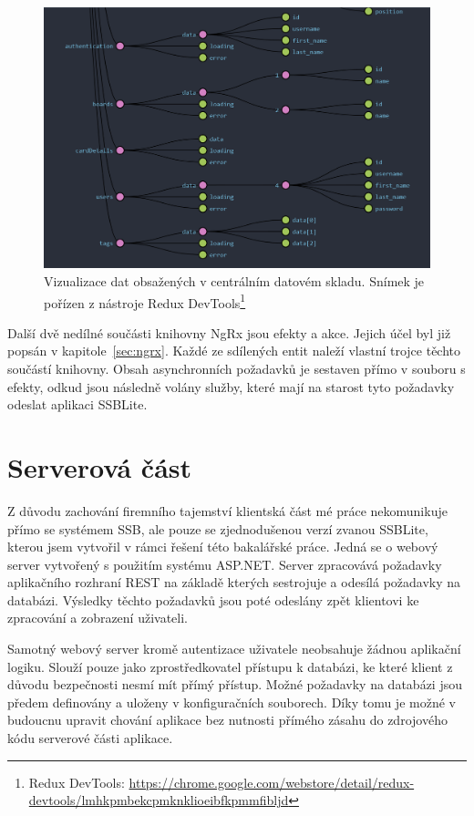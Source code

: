 \begin{figure}[H]
	\centering
	\label{img:ngrx-devtools}
	\includegraphics[width=\textwidth]{obrazky-figures/ngrx-chart.png}
	\caption{Vizualizace dat obsažených v centrálním datovém skladu. Snímek je pořízen z nástroje Redux DevTools\footnote{Redux DevTools: \url{https://chrome.google.com/webstore/detail/redux-devtools/lmhkpmbekcpmknklioeibfkpmmfibljd}}}
\end{figure}

Další dvě nedílné součásti knihovny NgRx jsou efekty a akce. Jejich účel byl již popsán v kapitole~\ref{sec:ngrx}. Každé ze sdílených entit naleží vlastní trojce těchto součástí knihovny. Obsah asynchronních požadavků je sestaven přímo v souboru s efekty, odkud jsou následně volány služby, které mají na starost tyto požadavky odeslat aplikaci SSBLite.



\section{Serverová část}
Z důvodu zachování firemního tajemství klientská část mé práce nekomunikuje přímo se systémem SSB, ale pouze se zjednodušenou verzí zvanou SSBLite, kterou jsem vytvořil v rámci řešení této bakalářské práce. Jedná se o webový server vytvořený s použitím systému ASP.NET. Server zpracovává požadavky aplikačního rozhraní REST na základě kterých sestrojuje a odesílá požadavky na databázi. Výsledky těchto požadavků jsou poté odeslány zpět klientovi ke zpracování a zobrazení uživateli.

Samotný webový server kromě autentizace uživatele neobsahuje žádnou aplikační logiku. Slouží pouze jako zprostředkovatel přístupu k databázi, ke které klient z důvodu bezpečnosti nesmí mít přímý přístup. Možné požadavky na databázi jsou předem definovány a uloženy v konfiguračních souborech. Díky tomu je možné v budoucnu upravit chování aplikace bez nutnosti přímého zásahu do zdrojového kódu serverové části aplikace. 


